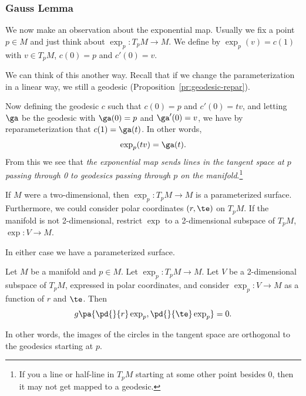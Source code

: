 \subsubsection{Gauss Lemma}
We now make an observation about the exponential map. Usually we fix a point $p\in M$ and just think about $\exp_p:T_pM\to M$. We define by $\exp_p(v)=c(1)$ with $v\in T_pM$, $c(0)=p$ and $c'(0)=v$.

We can think of this another way. Recall that if we change the parameterization in a linear way, we still a geodesic (Proposition~\ref{pr:geodesic-repar}). 

Now defining the geodesic $c$ such that $c(0)=p$ and $c'(0)=tv$, and letting $\ga$ be the geodesic with $\ga(0)=p$ and $\ga'(0)=v$, we have by reparameterization that $c(1)=\ga(t)$.
In other words, 
\[
\exp_p(tv)= \ga(t).
\]
From this we see that {\it the exponential map sends lines in the tangent space at $p$ passing through 0 to geodesics passing through $p$ on the manifold}.\footnote{If you a  line or half-line in $T_pM$ starting  at some other point besides 0, then it may not get mapped to a geodesic.}


If $M$ were a two-dimensional, then $\exp_p:T_pM\to M$ is a parameterized surface. Furthermore, we could consider polar coordinates $(r,\te)$ on $T_pM$.  If the manifold is not 2-dimensional, restrict $\exp$ to a 2-dimensional subspace of $T_pM$, $\exp:V\to M$.

In either case we have a parameterized surface. 
\begin{lem}
Let $M$ be a manifold and $p\in M$. Let $\exp_p:T_pM\to M$. Let $V$ be a 2-dimensional subspace of $T_pM$, expressed in polar coordinates, and consider $\exp_p:V\to M$ as a function of $r$ and $\te$. Then
\[
g\pa{\pd{}{r}\exp_p,\pd{}{\te} \exp_p}=0.
\]
\end{lem}
In other words, the images of the circles in the tangent space are orthogonal to the geodesics starting at $p$.

